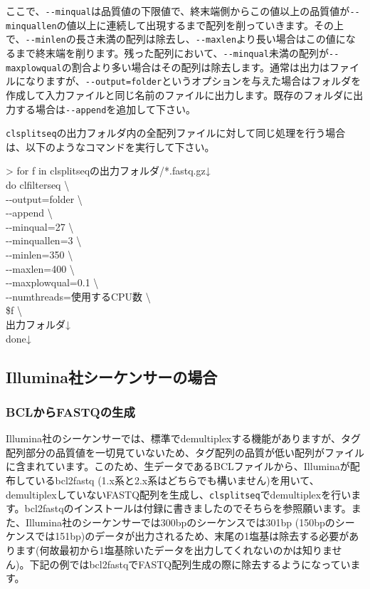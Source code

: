 \documentclass[titlepage,10pt,a4paper]{jsbook}
\newenvironment{cmd}{\begin{oframed}\raggedright\ttfamily\footnotesize\setlength{\baselineskip}{1.4em}}{\end{oframed}\vspace{-1em}}
\begin{document}
ここで、\texttt{{-}{-}minqual}は品質値の下限値で、終末端側からこの値以上の品質値が\texttt{{-}{-}minquallen}の値以上に連続して出現するまで配列を削っていきます。その上で、\texttt{{-}{-}minlen}の長さ未満の配列は除去し、\texttt{{-}{-}maxlen}より長い場合はこの値になるまで終末端を削ります。残った配列において、\texttt{{-}{-}minqual}未満の配列が\texttt{{-}{-}maxplowqual}の割合より多い場合はその配列は除去します。通常は出力はファイルになりますが、\texttt{{-}{-}output=folder}というオプションを与えた場合はフォルダを作成して入力ファイルと同じ名前のファイルに出力します。既存のフォルダに出力する場合は\texttt{{-}{-}append}を追加して下さい。

\texttt{clsplitseq}の出力フォルダ内の全配列ファイルに対して同じ処理を行う場合は、以下のようなコマンドを実行して下さい。

\begin{cmd}
{\textgreater} for f in clsplitseqの出力フォルダ/*.fastq.gz↓\\
do clfilterseq {\textbackslash}\\
{-}{-}output=folder {\textbackslash}\\
{-}{-}append {\textbackslash}\\
{-}{-}minqual=27 {\textbackslash}\\
{-}{-}minquallen=3 {\textbackslash}\\
{-}{-}minlen=350 {\textbackslash}\\
{-}{-}maxlen=400 {\textbackslash}\\
{-}{-}maxplowqual=0.1 {\textbackslash}\\
{-}{-}numthreads=使用するCPU数 {\textbackslash}\\
\$f {\textbackslash}\\
出力フォルダ↓\\
done↓
\end{cmd}

\subsection{Illumina社シーケンサーの場合}

\subsubsection{BCLからFASTQの生成}

Illumina社のシーケンサーでは、標準でdemultiplexする機能がありますが、タグ配列部分の品質値を一切見ていないため、タグ配列の品質が低い配列がファイルに含まれています。このため、生データであるBCLファイルから、Illuminaが配布しているbcl2fastq (1.x系と2.x系はどちらでも構いません)を用いて、demultiplexしていないFASTQ配列を生成し、\texttt{clsplitseq}でdemultiplexを行います。bcl2fastqのインストールは付録に書きましたのでそちらを参照願います。また、Illumina社のシーケンサーでは300bpのシーケンスでは301bp (150bpのシーケンスでは151bp)のデータが出力されるため、末尾の1塩基は除去する必要があります(何故最初から1塩基除いたデータを出力してくれないのかは知りません)。下記の例ではbcl2fastqでFASTQ配列生成の際に除去するようになっています。
\end{document}

